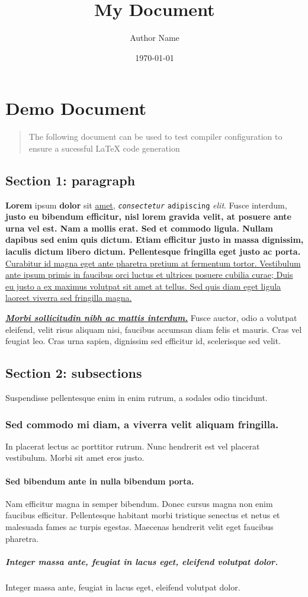 \documentclass{article}
\title{My Document}\author{Author Name}\date{\today}
\begin{document}
\section*{Demo Document}\begin{quote}

The following document can be used to test compiler configuration to ensure a sucessful LaTeX code generation

\end{quote}

\subsection*{Section 1: paragraph}
\textbf{Lorem} ipsum \textbf{dolor} sit \ul{amet}, \texttt{\textit{consectetur}} \texttt{adipiscing} \textit{elit}. Fusce interdum, \textbf{justo eu bibendum efficitur, nisl lorem gravida velit, at posuere ante urna vel est. Nam a mollis erat. Sed et commodo ligula. Nullam dapibus sed enim quis dictum. Etiam efficitur justo in massa dignissim, iaculis dictum libero dictum. Pellentesque fringilla eget justo ac porta.} \ul{Curabitur id magna eget ante pharetra pretium at fermentum tortor. Vestibulum ante ipsum primis in faucibus orci luctus et ultrices posuere cubilia curae; Duis eu justo a ex maximus volutpat sit amet at tellus. Sed quis diam eget ligula laoreet viverra sed fringilla magna.}  

\ul{\textbf{\textit{Morbi sollicitudin nibh ac mattis interdum.}}} Fusce auctor, odio a volutpat eleifend, velit risus aliquam nisi, faucibus accumsan diam felis et mauris. Cras vel feugiat leo. Cras urna sapien, dignissim sed efficitur id, scelerisque sed velit. 


\subsection*{Section 2: subsections}
Suspendisse pellentesque enim in enim rutrum, a sodales odio tincidunt. 
\subsubsection*{Sed commodo mi diam, a viverra velit aliquam fringilla. }
In placerat lectus ac porttitor rutrum. Nunc hendrerit est vel placerat vestibulum. Morbi sit amet eros justo. 
\paragraph{Sed bibendum ante in nulla bibendum porta. }
Nam efficitur magna in semper bibendum. Donec cursus magna non enim faucibus efficitur. Pellentesque habitant morbi tristique senectus et netus et malesuada fames ac turpis egestas. Maecenas hendrerit velit eget faucibus pharetra.
\subparagraph{Integer massa ante, feugiat in lacus eget, eleifend volutpat dolor.}
Integer massa ante, feugiat in lacus eget, eleifend volutpat dolor. 
\end{document}
